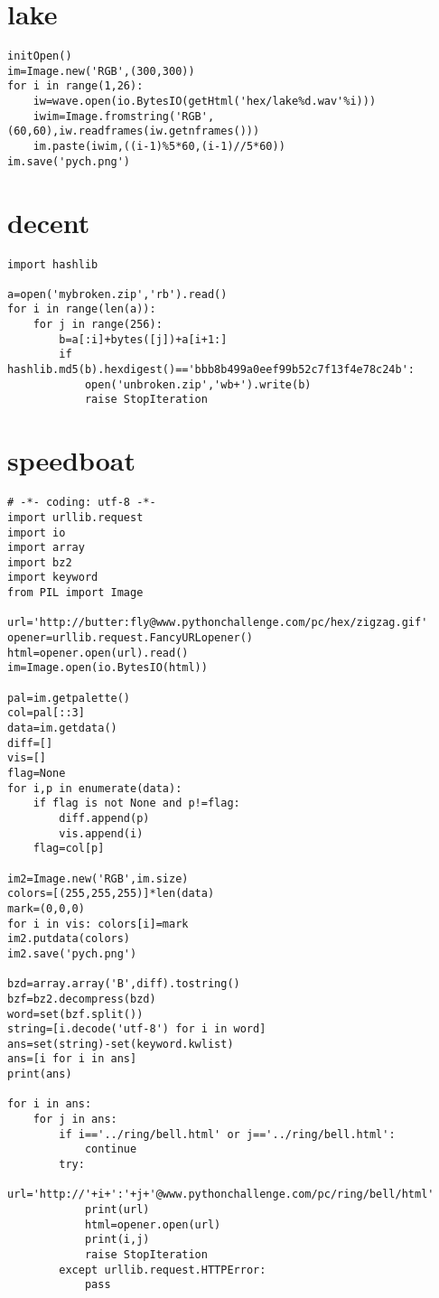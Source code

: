 \documentclass[onecolumn,a4paper,12pt]{article}
\begin{document}
\section{lake}
\begin{lstlisting}
initOpen()
im=Image.new('RGB',(300,300))
for i in range(1,26):
    iw=wave.open(io.BytesIO(getHtml('hex/lake%d.wav'%i)))
    iwim=Image.fromstring('RGB',(60,60),iw.readframes(iw.getnframes()))
    im.paste(iwim,((i-1)%5*60,(i-1)//5*60))
im.save('pych.png')
\end{lstlisting}

\section{decent}
\begin{lstlisting}
import hashlib

a=open('mybroken.zip','rb').read()
for i in range(len(a)):
    for j in range(256):
        b=a[:i]+bytes([j])+a[i+1:]
        if hashlib.md5(b).hexdigest()=='bbb8b499a0eef99b52c7f13f4e78c24b':
            open('unbroken.zip','wb+').write(b)
            raise StopIteration
\end{lstlisting}

\section{speedboat}
\begin{lstlisting}
# -*- coding: utf-8 -*-
import urllib.request
import io
import array
import bz2
import keyword
from PIL import Image

url='http://butter:fly@www.pythonchallenge.com/pc/hex/zigzag.gif'
opener=urllib.request.FancyURLopener()
html=opener.open(url).read()
im=Image.open(io.BytesIO(html))

pal=im.getpalette()
col=pal[::3]
data=im.getdata()
diff=[]
vis=[]
flag=None
for i,p in enumerate(data):
    if flag is not None and p!=flag:
        diff.append(p)
        vis.append(i)
    flag=col[p]

im2=Image.new('RGB',im.size)
colors=[(255,255,255)]*len(data)
mark=(0,0,0)
for i in vis: colors[i]=mark
im2.putdata(colors)
im2.save('pych.png')

bzd=array.array('B',diff).tostring()
bzf=bz2.decompress(bzd)
word=set(bzf.split())
string=[i.decode('utf-8') for i in word]
ans=set(string)-set(keyword.kwlist)
ans=[i for i in ans]
print(ans)

for i in ans:
    for j in ans:
        if i=='../ring/bell.html' or j=='../ring/bell.html':
            continue
        try:
            url='http://'+i+':'+j+'@www.pythonchallenge.com/pc/ring/bell/html'
            print(url)
            html=opener.open(url)
            print(i,j)
            raise StopIteration
        except urllib.request.HTTPError:
            pass
\end{lstlisting}
\end{document}
